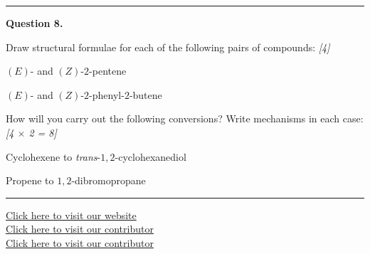 \documentclass[11pt,a4paper]{article}
\newcommand{\pts}[1]{\hfill   \textit{[#1]}}
\begin{document}
\medskip\rule{\linewidth}{0.2pt}




\noindent   \textbf{Question 8.}

\begin{parts}
  \item Draw structural formulae for each of the following pairs of compounds: \pts{4}
  
\begin{parts}
    \item $(E)$- and $(Z)$-$2$-pentene
    \item $(E)$- and $(Z)$-$2$-phenyl-$2$-butene
  \end{parts}
  \item How will you carry out the following conversions? Write mechanisms in each case: \pts{4 $ \times$ 2 = 8}
  
\begin{parts}
    \item Cyclohexene to   \textit{trans}-$1,2$-cyclohexanediol
    \item Propene to $1,2$-dibromopropane
  \end{parts}
\end{parts}

\vfill
\rule{\linewidth}{0.4pt}

\begin{center}\small
  \href{https://bhu-exam.vercel.app/}{Click here to visit our website}\\[4pt]
  \href{https://me-aryan.vercel.app/}{Click here to visit our contributor}\\[4pt]
  \href{https://quashan-me.vercel.app/}{Click here to visit our contributor}
\end{center}
\end{document}
